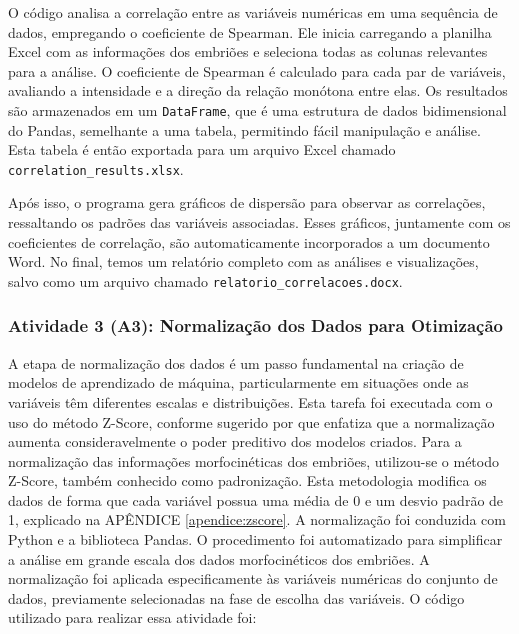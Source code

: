 O código analisa a correlação entre as variáveis numéricas em uma sequência de dados, empregando o coeficiente de Spearman. Ele inicia carregando a planilha Excel com as informações dos embriões e seleciona todas as colunas relevantes para a análise. O coeficiente de Spearman é calculado para cada par de variáveis, avaliando a intensidade e a direção da relação monótona entre elas. Os resultados são armazenados em um \texttt{DataFrame}, que é uma estrutura de dados bidimensional do Pandas, semelhante a uma tabela, permitindo fácil manipulação e análise. Esta tabela é então exportada para um arquivo Excel chamado \texttt{correlation\_results.xlsx}.

Após isso, o programa gera gráficos de dispersão para observar as correlações, ressaltando os padrões das variáveis associadas. Esses gráficos, juntamente com os coeficientes de correlação, são automaticamente incorporados a um documento Word. No final, temos um relatório completo com as análises e visualizações, salvo como um arquivo chamado \texttt{relatorio\_correlacoes.docx}.

\subsubsection{Atividade 3 (A3): Normalização dos Dados para Otimização}
A etapa de normalização dos dados é um passo fundamental na criação de modelos de aprendizado de máquina, particularmente em situações onde as variáveis têm diferentes escalas e distribuições. Esta tarefa foi executada com o uso do método Z-Score, conforme sugerido por  que enfatiza que a normalização aumenta consideravelmente o poder preditivo dos modelos criados. 
Para a normalização das informações morfocinéticas dos embriões, utilizou-se o método Z-Score, também conhecido como padronização. Esta metodologia modifica os dados de forma que cada variável possua uma média de 0 e um desvio padrão de 1, explicado na APÊNDICE \ref{apendice:zscore}. 
A normalização foi conduzida com Python e a biblioteca Pandas. O procedimento foi automatizado para simplificar a análise em grande escala dos dados morfocinéticos dos embriões. A normalização foi aplicada especificamente às variáveis numéricas do conjunto de dados, previamente selecionadas na fase de escolha das variáveis. O código utilizado para realizar essa atividade foi:

